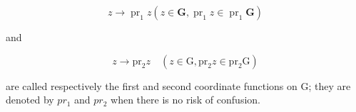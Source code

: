 \[
z \rightarrow \operatorname{pr} _ {1} z (z \in \mathbf {G}, \operatorname{pr} _ {1} z \in \operatorname{pr} _ {1} \mathbf {G})
\]

and

\[
z \rightarrow \mathrm{pr} _ {2} z \quad (z \in \mathrm{G}, \mathrm{pr} _ {2} z \in \mathrm{pr} _ {2} \mathrm{G})
\]

are called respectively the first and second coordinate functions on G; they are denoted by \(pr_{1}\) and \(pr_{2}\) when there is no risk of confusion.

